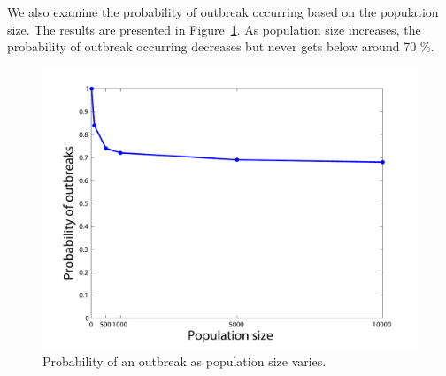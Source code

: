 We also examine the probability of outbreak occurring based on the population size. The results are presented in Figure~\ref{fig:OtbreakProb}. As population size increases, the probability of outbreak occurring decreases but never gets below around 70 \%. 
\begin{figure}[h!]
\begin{center}
\includegraphics[scale=0.5]{OutbreakProb}
\end{center}
\caption{Probability of an outbreak as population size varies.}
\label{fig:OtbreakProb}
\end{figure}
\pagebreak

